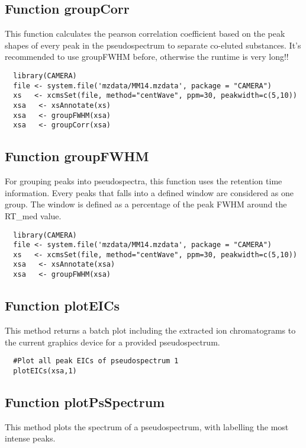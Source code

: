 \documentclass[a4paper,12pt]{article}
\begin{document}
\subsection{Function groupCorr}
\label{sec:groupCorr}
This function calculates the pearson correlation coefficient based on the peak
shapes of every peak in the pseudospectrum to separate co-eluted substances.
It's recommended to use groupFWHM before, otherwise the runtime is very long!!

\begin{verbatim}
  library(CAMERA)
  file <- system.file('mzdata/MM14.mzdata', package = "CAMERA")
  xs   <- xcmsSet(file, method="centWave", ppm=30, peakwidth=c(5,10))
  xsa   <- xsAnnotate(xs)
  xsa   <- groupFWHM(xsa)
  xsa   <- groupCorr(xsa)
\end{verbatim}

\subsection{Function groupFWHM}
\label{sec:groupFWHM}
For grouping peaks into pseudospectra, this function uses the retention time
information. Every peaks that falls into a defined window are considered as one
group. The window is defined as a percentage of the peak FWHM around the
RT\_med value.

\begin{verbatim}
  library(CAMERA)
  file <- system.file('mzdata/MM14.mzdata', package = "CAMERA")
  xs   <- xcmsSet(file, method="centWave", ppm=30, peakwidth=c(5,10))
  xsa   <- xsAnnotate(xsa)
  xsa   <- groupFWHM(xsa)
\end{verbatim}

\subsection{Function plotEICs}
\label{sec:plotEICs}
  This method returns a batch plot including the extracted ion chromatograms to
  the current graphics device for a provided pseudospectrum.

\begin{verbatim}
  #Plot all peak EICs of pseudospectrum 1
  plotEICs(xsa,1)
\end{verbatim}

\subsection{Function plotPsSpectrum}
\label{sec:plotPsSpectrum}
  This method plots the spectrum of a pseudospectrum, with labelling the most
  intense peaks.
\end{document}
